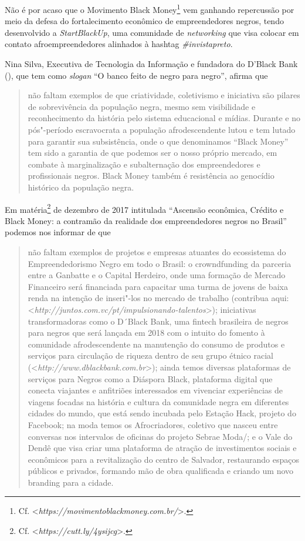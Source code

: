 Não é por acaso que o Movimento Black Money\footnote{Cf.
  \textless{}\emph{https://movimentoblackmoney.com.br/}\textgreater{}.} vem ganhando repercussão
por meio da defesa do fortalecimento econômico de empreendedores negros,
tendo desenvolvido a \emph{StartBlackUp}, uma comunidade de
\emph{networking} que visa colocar em contato afroempreendedores
alinhados à hashtag \emph{\#invistapreto}.

Nina Silva, Executiva de Tecnologia da Informação e fundadora do D'Black
Bank (), que tem como \emph{slogan} ``O banco feito de negro para
negro'', afirma que

\begin{quote}
não faltam exemplos de que criatividade, coletivismo e iniciativa são
pilares de sobrevivência da população negra, mesmo sem visibilidade e
reconhecimento da história pelo sistema educacional e mídias. Durante e
no pós"-período escravocrata a população afrodescendente lutou e tem
lutado para garantir sua subsistência, onde o que denominamos ``Black
Money'' tem sido a garantia de que podemos ser o nosso próprio mercado,
em combate à marginalização e subalternação dos empreendedores e
profissionais negros. Black Money também é resistência ao genocídio
histórico da população negra.
\end{quote}

Em matéria\footnote{Cf.
  \textless{}\emph{https://cutt.ly/4ysijcg}\textgreater{}.}
de dezembro de 2017 intitulada ``Ascensão econômica, Crédito e Black
Money: a contramão da realidade dos empreendedores negros no Brasil''
podemos nos informar de que

\begin{quote}
não faltam exemplos de projetos e empresas atuantes do ecossistema do
Empreendedorismo Negro em todo o Brasil: o crowndfunding da parceria
entre a Ganbatte e o Capital Herdeiro, onde uma formação de Mercado
Financeiro será financiada para capacitar uma turma de jovens de baixa
renda na intenção de inseri"-los no mercado de trabalho (contribua aqui:
\textless{}\emph{http://juntos.com.vc/pt/impulsionando-talentos}\textgreater{}); iniciativas
transformadoras como o D´Black Bank, uma fintech brasileira de negros
para negros que será lançada em 2018 com o intuito do fomento à
comunidade afrodescendente na manutenção do consumo de produtos e
serviços para circulação de riqueza dentro de seu grupo étnico racial
(\textless{}\emph{http://www.dblackbank.com.br}\textgreater{}); ainda temos diversas plataformas
de serviços para Negros como a Diáspora Black, plataforma digital que
conecta viajantes e anfitriões interessados em vivenciar experiências de
viagens focadas na história e cultura da comunidade negra em diferentes
cidades do mundo, que está sendo incubada pelo Estação Hack, projeto do
Facebook; na moda temos os Afrocriadores, coletivo que nasceu entre
conversas nos intervalos de oficinas do projeto Sebrae Moda/; e o Vale
do Dendê que visa criar uma plataforma de atração de investimentos
sociais e econômicos para a revitalização do centro de Salvador,
restaurando espaços públicos e privados, formando mão de obra
qualificada e criando um novo branding para a cidade.
\end{quote}

